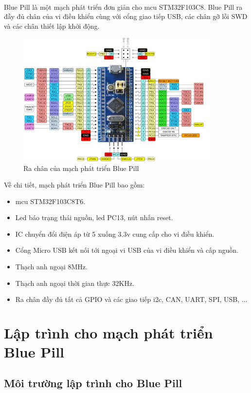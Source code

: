 \paragraph{}
Blue Pill là một mạch phát triển đơn giản cho \acrlong{mcu} STM32F103C8. Blue Pill ra đầy đủ chân của vi điều khiển cùng với cổng giao tiếp USB, các chân gỡ lỗi SWD và các chân thiết lập khởi động. 
\begin{figure}[H]
    \centering
    \includegraphics[width=0.9\textwidth]{images/STM32-Blue-Pill-Development-Board-Pinout.jpg}
    \caption{Ra chân của mạch phát triển Blue Pill}
    \label{fig:enter-label}
\end{figure}
Về chi tiết, mạch phát triển Blue Pill bao gồm:
\begin{itemize}
    \item \acrshort{mcu} STM32F103C8T6.
    \item Led báo trạng thái nguồn, led PC13, nút nhấn reset.
    \item IC chuyển đổi điện áp từ 5 xuống 3.3v cung cấp cho vi điều khiển.
    \item Cổng Micro USB kết nối tới ngoại vi USB của vi điều khiển và cấp nguồn.
    \item Thạch anh ngoại 8MHz.
    \item Thạch anh ngoại thời gian thực 32KHz.
    \item Ra chân đầy đủ tất cả GPIO và các giao tiếp \acrshort{i2c}, CAN, UART, SPI, USB, ...
\end{itemize}
\section{Lập trình cho mạch phát triển Blue Pill}
\subsection{Môi trường lập trình cho Blue Pill}

